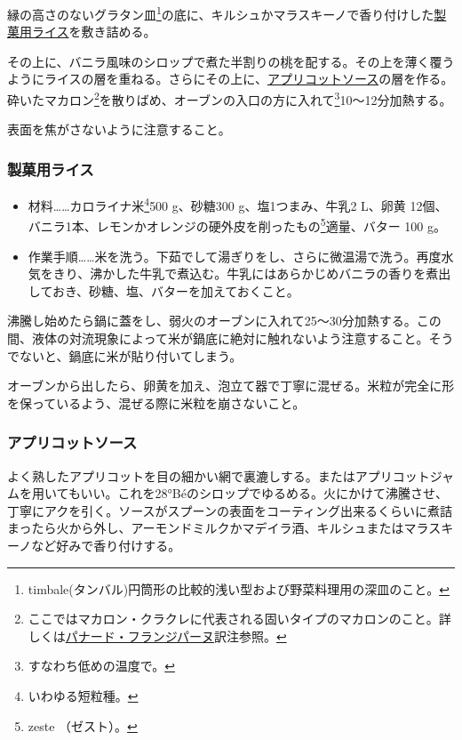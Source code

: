 
縁の高さのないグラタン皿\footnote{timbale(タンバル)円筒形の比較的浅い型および野菜料理用の深皿のこと。}の底に、キルシュかマラスキーノで香り付けした\protect\hyperlink{riz-pour-entremets}{製菓用ライス}を敷き詰める。

その上に、バニラ風味のシロップで煮た半割りの桃を配する。その上を薄く覆うようにライスの層を重ねる。さらにその上に、\protect\hyperlink{sauce-a-l-abricot}{アプリコットソース}の層を作る。砕いたマカロン\footnote{ここではマカロン・クラクレに代表される固いタイプのマカロンのこと。詳しくは\protect\hyperlink{panade-frangipane}{パナード・フランジパーヌ}訳注参照。}を散りばめ、オーブンの入口の方に入れて\footnote{すなわち低めの温度で。}10〜12分加熱する。

表面を焦がさないように注意すること。

\hypertarget{riz-pour-entremets}{%
\subsubsection{製菓用ライス}\label{riz-pour-entremets}}

\begin{itemize}
\item
  材料\ldots{}\ldots{}カロライナ米\footnote{いわゆる短粒種。}500
  g、砂糖300 g、塩1つまみ、牛乳2 L、卵黄
  12個、バニラ1本、レモンかオレンジの硬外皮を削ったもの\footnote{zeste
    （ゼスト）。}適量、バター 100 g。
\item
  作業手順\ldots{}\ldots{}米を洗う。下茹でして湯ぎりをし、さらに微温湯で洗う。再度水気をきり、沸かした牛乳で煮込む。牛乳にはあらかじめバニラの香りを煮出しておき、砂糖、塩、バターを加えておくこと。
\end{itemize}

沸騰し始めたら鍋に蓋をし、弱火のオーブンに入れて25〜30分加熱する。この間、液体の対流現象によって米が鍋底に絶対に触れないよう注意すること。そうでないと、鍋底に米が貼り付いてしまう。

オーブンから出したら、卵黄を加え、泡立て器で丁寧に混ぜる。米粒が完全に形を保っているよう、混ぜる際に米粒を崩さないこと。

\hypertarget{sauce-a-l-abricot}{%
\subsubsection{アプリコットソース}\label{sauce-a-l-abricot}}

よく熟したアプリコットを目の細かい網で裏漉しする。またはアプリコットジャムを用いてもいい。これを28°Béのシロップでゆるめる。火にかけて沸騰させ、丁寧にアクを引く。ソースがスプーンの表面をコーティング出来るくらいに煮詰まったら火から外し、アーモンドミルクかマデイラ酒、キルシュまたはマラスキーノなど好みで香り付けする。

